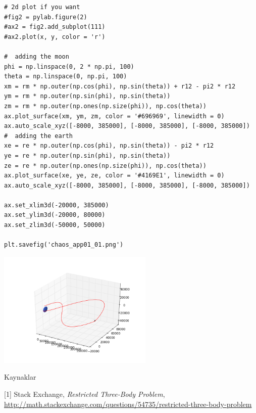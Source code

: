 \documentclass[12pt,fleqn]{article}\usepackage{../../common}
\begin{document}
\begin{verbatim}
# 2d plot if you want
#fig2 = pylab.figure(2)
#ax2 = fig2.add_subplot(111)
#ax2.plot(x, y, color = 'r')

#  adding the moon
phi = np.linspace(0, 2 * np.pi, 100)
theta = np.linspace(0, np.pi, 100)
xm = rm * np.outer(np.cos(phi), np.sin(theta)) + r12 - pi2 * r12
ym = rm * np.outer(np.sin(phi), np.sin(theta))
zm = rm * np.outer(np.ones(np.size(phi)), np.cos(theta))
ax.plot_surface(xm, ym, zm, color = '#696969', linewidth = 0)
ax.auto_scale_xyz([-8000, 385000], [-8000, 385000], [-8000, 385000])
#  adding the earth
xe = re * np.outer(np.cos(phi), np.sin(theta)) - pi2 * r12
ye = re * np.outer(np.sin(phi), np.sin(theta))
ze = re * np.outer(np.ones(np.size(phi)), np.cos(theta))
ax.plot_surface(xe, ye, ze, color = '#4169E1', linewidth = 0)
ax.auto_scale_xyz([-8000, 385000], [-8000, 385000], [-8000, 385000])

ax.set_xlim3d(-20000, 385000)
ax.set_ylim3d(-20000, 80000)
ax.set_zlim3d(-50000, 50000)

plt.savefig('chaos_app01_01.png')
\end{verbatim}







\includegraphics[width=20em]{chaos_app01_01.png}

Kaynaklar

[1] Stack Exchange, {\em Restricted Three-Body Problem}, \url{http://math.stackexchange.com/questions/54735/restricted-three-body-problem}
\end{document}
